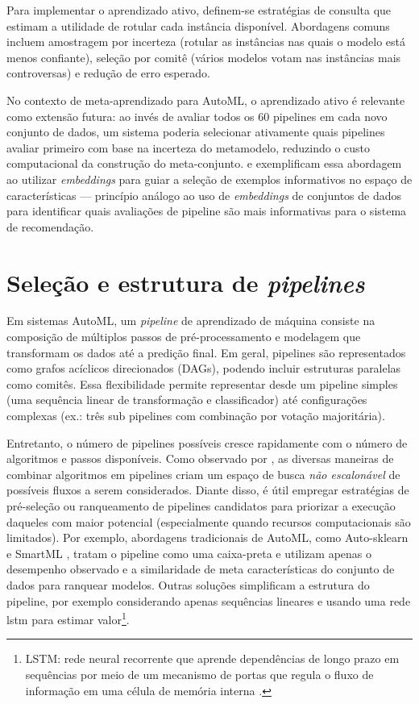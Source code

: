 Para implementar o aprendizado ativo, definem-se estratégias de consulta que estimam a utilidade de rotular cada instância disponível. Abordagens comuns incluem amostragem por incerteza (rotular as instâncias nas quais o modelo está menos confiante), seleção por comitê (vários modelos votam nas instâncias mais controversas) e redução de erro esperado.

No contexto de meta-aprendizado para AutoML, o aprendizado ativo é relevante como extensão futura: ao invés de avaliar todos os 60 pipelines em cada novo conjunto de dados, um sistema poderia selecionar ativamente quais pipelines avaliar primeiro com base na incerteza do metamodelo, reduzindo o custo computacional da construção do meta-conjunto.  e  exemplificam essa abordagem ao utilizar \textit{embeddings} para guiar a seleção de exemplos informativos no espaço de características — princípio análogo ao uso de \textit{embeddings} de conjuntos de dados para identificar quais avaliações de pipeline são mais informativas para o sistema de recomendação.

\section{Seleção e estrutura de \textit{pipelines}}
Em sistemas AutoML, um \emph{pipeline} de aprendizado de máquina consiste na composição de múltiplos passos de pré-processamento e modelagem que transformam os dados até a predição final. Em geral, pipelines são representados como grafos acíclicos direcionados (DAGs), podendo incluir estruturas paralelas como comitês. Essa flexibilidade permite representar desde um pipeline simples (uma sequência linear de transformação e classificador) até configurações complexas (ex.: três sub pipelines com combinação por votação majoritária).  

Entretanto, o número de pipelines possíveis cresce rapidamente com o número de algoritmos e passos disponíveis. Como observado por , as diversas maneiras de combinar algoritmos em pipelines criam um espaço de busca \emph{não escalonável} de possíveis fluxos a serem considerados. Diante disso, é útil empregar estratégias de pré-seleção ou ranqueamento de pipelines candidatos para priorizar a execução daqueles com maior potencial (especialmente quando recursos computacionais são limitados). Por exemplo, abordagens tradicionais de AutoML, como Auto-sklearn \cite{FeurerAutosklearn2015} e SmartML \cite{Maher2019}, tratam o pipeline como uma caixa-preta e utilizam apenas o desempenho observado e a similaridade de meta características do conjunto de dados para ranquear modelos. Outras soluções simplificam a estrutura do pipeline, por exemplo considerando apenas sequências lineares e usando uma rede \gls{lstm} para estimar valor\footnote{LSTM: rede neural recorrente que aprende dependências de longo prazo em sequências por meio de um mecanismo de portas que regula o fluxo de informação em uma célula de memória interna .}.

